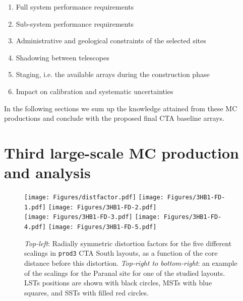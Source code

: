 \documentclass{PoS}
\newcommand{\mcprod}[1]{\texttt{prod#1}}
\begin{document}
\begin{enumerate}
    \item Full system performance requirements
    \item Sub-system performance requirements
    \item Administrative and geological constraints of the selected sites
    \item Shadowing between telescopes
    \item Staging, i.e. the available arrays during the construction phase 
    \item Impact on calibration and systematic uncertainties
\end{enumerate}

In the following sections we sum up the knowledge attained from these MC productions and conclude with the proposed final CTA baseline arrays.

\section{Third large-scale MC production and analysis}

\begin{figure}[ht]
\begin{center}
\texttt{[image: Figures/distfactor.pdf]}
\texttt{[image: Figures/3HB1-FD-1.pdf]}
\texttt{[image: Figures/3HB1-FD-2.pdf]}\\
\texttt{[image: Figures/3HB1-FD-3.pdf]}
\texttt{[image: Figures/3HB1-FD-4.pdf]}
\texttt{[image: Figures/3HB1-FD-5.pdf]}\\
\caption{\textit{Top-left}: Radially symmetric distortion factors for the five different scalings in \mcprod{3} CTA South layouts, as a function of the core distance before this distortion. \textit{Top-right to bottom-right}: an example of the scalings for the Paranal site for one of the studied layouts. LSTs positions are shown with black circles, MSTs with blue squares, and SSTs with filled red circles.}
\label{fig:distfactor}
\end{center}
\end{figure}
\end{document}
